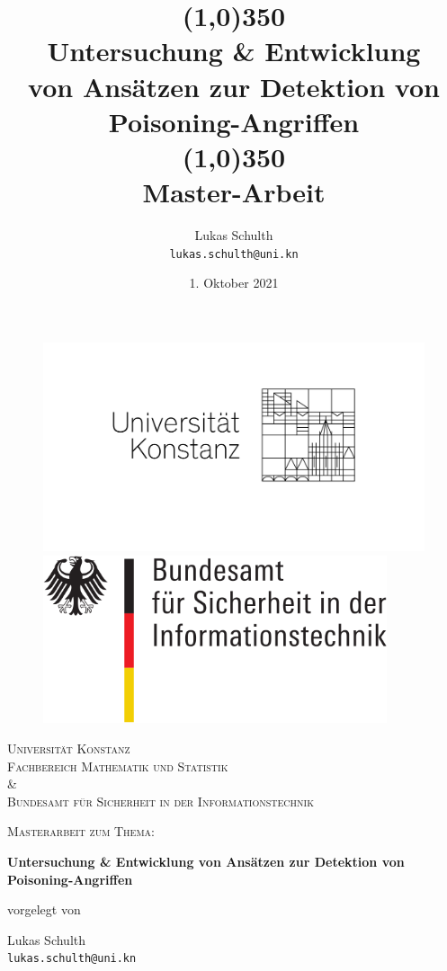 \documentclass[11pt,a4paper]{article}
\title{\line(1,0){350}\\Untersuchung \& Entwicklung \\von Ansätzen zur Detektion von Poisoning-Angriffen\\\line(1,0){350}\\
	Master-Arbeit}
\author{
	Lukas Schulth\\
	\texttt{lukas.schulth@uni.kn}
}
\date{1. Oktober 2021}
\numberwithin{equation}{section}
\begin{document}
	
	\begin{titlepage}
		\thispagestyle{empty} 
		\begin{figure}
			\centering
			\begin{minipage}{0.45\textwidth}
				\centering
				\includegraphics[width=1.2\textwidth]{logounikn} %
				
			\end{minipage}\hfill
			\begin{minipage}{0.45\textwidth}
				\centering
				\includegraphics[width=0.9\textwidth]{bsi_logo} %
				
			\end{minipage}
		\end{figure}
		\centering
		\vspace{1cm}
		{\scshape\LARGE Universität Konstanz\\
			\large Fachbereich Mathematik und Statistik\\
			\& \\ \LARGE Bundesamt für Sicherheit in der Informationstechnik \par}
		\vspace{1cm}
		{\scshape\Large Masterarbeit zum Thema:\par}
		\vspace{0.5cm}
		{\Huge \bfseries Untersuchung \& Entwicklung von Ansätzen zur Detektion von Poisoning-Angriffen\par} %
		\vspace{0.5cm}
		vorgelegt von \par
		\vspace{0.5cm}
		{\Large Lukas Schulth\\
			\texttt{lukas.schulth@uni.kn}\par}
		

\end{titlepage}
\end{document}
